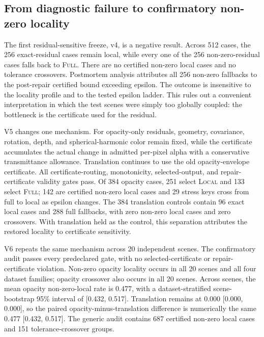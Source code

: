 \documentclass[acmtog,nonacm]{acmart}
\newcommand{\FULL}{\textsc{Full}}
\newcommand{\LOCAL}{\textsc{Local}}
\begin{document}
\subsection{From diagnostic failure to confirmatory non-zero locality}
The first residual-sensitive freeze, v4, is a negative result. Across 512 cases, the 256 exact-residual cases remain local, while every one of the 256 non-zero-residual cases falls back to \FULL{}. There are no certified non-zero local cases and no tolerance crossovers. Postmortem analysis attributes all 256 non-zero fallbacks to the post-repair certified bound exceeding epsilon. The outcome is insensitive to the locality profile and to the tested epsilon ladder. This rules out a convenient interpretation in which the test scenes were simply too globally coupled: the bottleneck is the certificate used for the residual.

V5 changes one mechanism. For opacity-only residuals, geometry, covariance, rotation, depth, and spherical-harmonic color remain fixed, while the certificate accumulates the actual change in admitted per-pixel alpha with a conservative transmittance allowance. Translation continues to use the old opacity-envelope certificate. All certificate-routing, monotonicity, selected-output, and repair-certificate validity gates pass. Of 384 opacity cases, 251 select \LOCAL{} and 133 select \FULL{}; 142 are certified non-zero local cases and 29 stress keys cross from full to local as epsilon changes. The 384 translation controls contain 96 exact local cases and 288 full fallbacks, with zero non-zero local cases and zero crossovers. With translation held as the control, this separation attributes the restored locality to certificate sensitivity.

V6 repeats the same mechanism across 20 independent scenes. The confirmatory audit passes every predeclared gate, with no selected-certificate or repair-certificate violation. Non-zero opacity locality occurs in all 20 scenes and all four dataset families; opacity crossover also occurs in all 20 scenes. Across scenes, the mean opacity non-zero-local rate is 0.477, with a dataset-stratified scene-bootstrap 95\% interval of [0.432, 0.517]. Translation remains at 0.000 [0.000, 0.000], so the paired opacity-minus-translation difference is numerically the same 0.477 [0.432, 0.517]. The generic audit contains 687 certified non-zero local cases and 151 tolerance-crossover groups.
\end{document}
